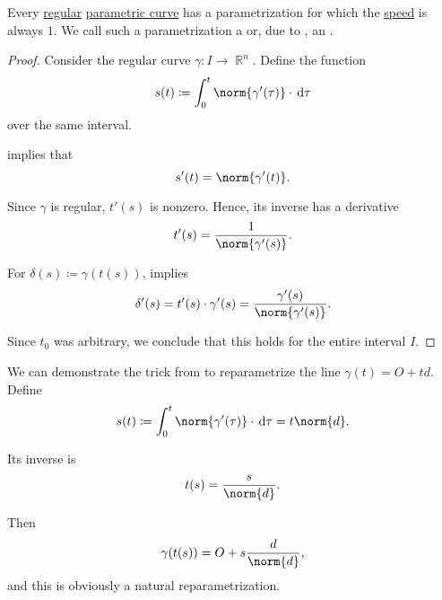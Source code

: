 \begin{proposition}\label{thm:natural_parametrization_existence}
  Every \hyperref[def:regular_curve]{regular} \hyperref[def:parametric_curve]{parametric curve} has a parametrization for which the \hyperref[def:curve_speed]{speed} is always \( 1 \). We call such a parametrization a  or, due to , an .
\end{proposition}
\begin{proof}
  Consider the regular curve \( \gamma: I \to \BbbR^n \). Define the function
  \begin{equation*}
    s(t) \coloneqq \int_0^t \norm{\gamma'(\tau)} \cdot \dl \tau
  \end{equation*}
  over the same interval.

   implies that
  \begin{equation*}
    s'(t) = \norm{\gamma'(t)}.
  \end{equation*}

  Since \( \gamma \) is regular, \( t'(s) \) is nonzero. Hence, its inverse has a derivative
  \begin{equation*}
    t'(s) = \frac 1 {\norm{\gamma'(s)}}.
  \end{equation*}

  For \( \delta(s) \coloneqq \gamma(t(s)) \),  implies
  \begin{equation*}
    \delta'(s)
    =
    t'(s) \cdot \gamma'(s)
    =
    \frac {\gamma'(s)} {\norm{\gamma'(s)}}.
  \end{equation*}

  Since \( t_0 \) was arbitrary, we conclude that this holds for the entire interval \( I \).
\end{proof}

\begin{example}\label{ex:natural_reparametrization_of_line}
  We can demonstrate the trick from  to reparametrize the line \( \gamma(t) = O + td \). Define
  \begin{equation*}
    s(t) \coloneqq \int_0^t \norm{\gamma'(\tau)} \cdot \dl \tau = t \norm{d}.
  \end{equation*}

  Its inverse is
  \begin{equation*}
    t(s) = \frac s {\norm{d}}.
  \end{equation*}

  Then
  \begin{equation*}
    \gamma(t(s)) = O + s \frac d {\norm{d}},
  \end{equation*}
  and this is obviously a natural reparametrization.
\end{example}

